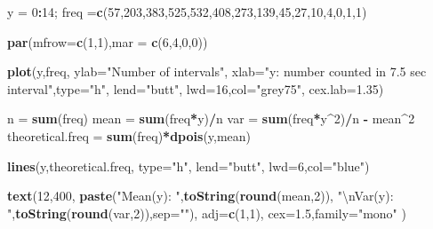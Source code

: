 \documentclass[]{book}
\newenvironment{Shaded}{\begin{snugshade}}{\end{snugshade}}
\newcommand{\CharTok}[1]{\textcolor[rgb]{0.31,0.60,0.02}{#1}}
\newcommand{\DataTypeTok}[1]{\textcolor[rgb]{0.13,0.29,0.53}{#1}}
\newcommand{\DecValTok}[1]{\textcolor[rgb]{0.00,0.00,0.81}{#1}}
\newcommand{\FloatTok}[1]{\textcolor[rgb]{0.00,0.00,0.81}{#1}}
\newcommand{\KeywordTok}[1]{\textcolor[rgb]{0.13,0.29,0.53}{\textbf{#1}}}
\newcommand{\NormalTok}[1]{#1}
\newcommand{\OperatorTok}[1]{\textcolor[rgb]{0.81,0.36,0.00}{\textbf{#1}}}
\newcommand{\StringTok}[1]{\textcolor[rgb]{0.31,0.60,0.02}{#1}}
\begin{document}
\begin{Shaded}
\begin{Highlighting}[]
\NormalTok{y =}\StringTok{ }\DecValTok{0}\OperatorTok{:}\DecValTok{14}\NormalTok{; freq =}\KeywordTok{c}\NormalTok{(}\DecValTok{57}\NormalTok{,}\DecValTok{203}\NormalTok{,}\DecValTok{383}\NormalTok{,}\DecValTok{525}\NormalTok{,}\DecValTok{532}\NormalTok{,}\DecValTok{408}\NormalTok{,}\DecValTok{273}\NormalTok{,}\DecValTok{139}\NormalTok{,}\DecValTok{45}\NormalTok{,}\DecValTok{27}\NormalTok{,}\DecValTok{10}\NormalTok{,}\DecValTok{4}\NormalTok{,}\DecValTok{0}\NormalTok{,}\DecValTok{1}\NormalTok{,}\DecValTok{1}\NormalTok{)}

\KeywordTok{par}\NormalTok{(}\DataTypeTok{mfrow=}\KeywordTok{c}\NormalTok{(}\DecValTok{1}\NormalTok{,}\DecValTok{1}\NormalTok{),}\DataTypeTok{mar =} \KeywordTok{c}\NormalTok{(}\DecValTok{6}\NormalTok{,}\DecValTok{4}\NormalTok{,}\DecValTok{0}\NormalTok{,}\DecValTok{0}\NormalTok{))}

\KeywordTok{plot}\NormalTok{(y,freq,}
  \DataTypeTok{ylab=}\StringTok{"Number of intervals"}\NormalTok{,}
  \DataTypeTok{xlab=}\StringTok{"y: number counted in 7.5 sec interval"}\NormalTok{,}\DataTypeTok{type=}\StringTok{"h"}\NormalTok{,}
  \DataTypeTok{lend=}\StringTok{"butt"}\NormalTok{, }\DataTypeTok{lwd=}\DecValTok{16}\NormalTok{,}\DataTypeTok{col=}\StringTok{"grey75"}\NormalTok{, }\DataTypeTok{cex.lab=}\FloatTok{1.35}\NormalTok{)}

\NormalTok{n =}\StringTok{ }\KeywordTok{sum}\NormalTok{(freq)}
\NormalTok{mean =}\StringTok{ }\KeywordTok{sum}\NormalTok{(freq}\OperatorTok{*}\NormalTok{y)}\OperatorTok{/}\NormalTok{n}
\NormalTok{var =}\StringTok{  }\KeywordTok{sum}\NormalTok{(freq}\OperatorTok{*}\NormalTok{y}\OperatorTok{^}\DecValTok{2}\NormalTok{)}\OperatorTok{/}\NormalTok{n }\OperatorTok{-}\StringTok{ }\NormalTok{mean}\OperatorTok{^}\DecValTok{2}
\NormalTok{theoretical.freq =}\StringTok{ }\KeywordTok{sum}\NormalTok{(freq)}\OperatorTok{*}\KeywordTok{dpois}\NormalTok{(y,mean)}

\KeywordTok{lines}\NormalTok{(y,theoretical.freq, }\DataTypeTok{type=}\StringTok{"h"}\NormalTok{,}
      \DataTypeTok{lend=}\StringTok{"butt"}\NormalTok{, }\DataTypeTok{lwd=}\DecValTok{6}\NormalTok{,}\DataTypeTok{col=}\StringTok{"blue"}\NormalTok{)}

\KeywordTok{text}\NormalTok{(}\DecValTok{12}\NormalTok{,}\DecValTok{400}\NormalTok{, }\KeywordTok{paste}\NormalTok{(}\StringTok{"Mean(y): "}\NormalTok{,}\KeywordTok{toString}\NormalTok{(}\KeywordTok{round}\NormalTok{(mean,}\DecValTok{2}\NormalTok{)),}
           \StringTok{"}\CharTok{\textbackslash{}n}\StringTok{Var(y): "}\NormalTok{,}\KeywordTok{toString}\NormalTok{(}\KeywordTok{round}\NormalTok{(var,}\DecValTok{2}\NormalTok{)),}\DataTypeTok{sep=}\StringTok{""}\NormalTok{), }
     \DataTypeTok{adj=}\KeywordTok{c}\NormalTok{(}\DecValTok{1}\NormalTok{,}\DecValTok{1}\NormalTok{), }\DataTypeTok{cex=}\FloatTok{1.5}\NormalTok{,}\DataTypeTok{family=}\StringTok{"mono"}\NormalTok{  )}


\end{Highlighting}
\end{Shaded}
\end{document}
